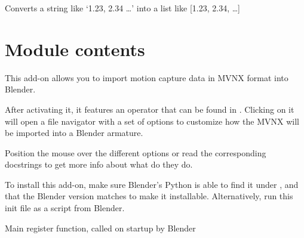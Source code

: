 \documentclass[letterpaper,10pt,english,openany,oneside]{sphinxmanual}
\begin{document}

\begin{fulllineitems}
\label{\detokenize{io_anim_mvnx:io_anim_mvnx.utils.str_to_vec}}
Converts a string like ‘1.23, 2.34 …’ into a list
like {[}1.23, 2.34, …{]}

\end{fulllineitems}



\section{Module contents}
\label{\detokenize{io_anim_mvnx:module-io_anim_mvnx}}\label{\detokenize{io_anim_mvnx:module-contents}}
This add-on allows you to import motion capture data in MVNX format
into Blender.

After activating it, it features an operator that can be found in
. Clicking on it will open a file navigator
with a set of options to customize how the MVNX will be imported
into a Blender armature.

Position the mouse over the different options or read the corresponding
docstrings to get more info about what do they do.

To install this add-on, make sure Blender’s Python is able to find it
under , and that the Blender version matches to make
it installable. Alternatively, run this init file as a script from Blender.

\begin{fulllineitems}
\label{\detokenize{io_anim_mvnx:io_anim_mvnx.register}}
Main register function, called on startup by Blender

\end{fulllineitems}

\end{document}
